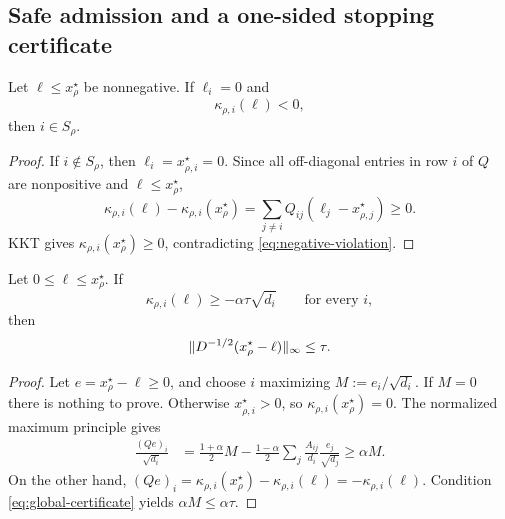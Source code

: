 \subsection{Safe admission and a one-sided stopping certificate}

\begin{lemma}
\label{lem:safe-admission}
Let $\ell\leq x_\rho^\star$ be nonnegative.  If $\ell_i=0$ and
\begin{equation}
  \kappa_{\rho,i}(\ell)<0,
  \label{eq:negative-violation}
\end{equation}
then $i\in S_\rho$.
\end{lemma}

\begin{proof}
If $i\notin S_\rho$, then $\ell_i=x_{\rho,i}^\star=0$.  Since all
off-diagonal entries in row $i$ of $Q$ are nonpositive and
$\ell\leq x_\rho^\star$,
\[
 \kappa_{\rho,i}(\ell)-\kappa_{\rho,i}(x_\rho^\star)
 =\sum_{j\neq i}Q_{ij}(\ell_j-x_{\rho,j}^\star)\geq0.
\]
KKT gives $\kappa_{\rho,i}(x_\rho^\star)\geq0$, contradicting
\cref{eq:negative-violation}.
\end{proof}

\begin{lemma}
\label{lem:one-sided-certificate}
Let $0\leq\ell\leq x_\rho^\star$.  If
\begin{equation}
  \kappa_{\rho,i}(\ell)\geq-\alpha\tau\sqrt{d_i}
  \qquad\text{for every }i,
  \label{eq:global-certificate}
\end{equation}
then
\begin{equation}
  \lVert D^{-1/2}(x_\rho^\star-\ell)\rVert_\infty\leq\tau.
  \label{eq:certificate-error}
\end{equation}
\end{lemma}

\begin{proof}
Let $e=x_\rho^\star-\ell\geq0$, and choose $i$ maximizing
$M:=e_i/\sqrt{d_i}$.  If $M=0$ there is nothing to prove.  Otherwise
$x_{\rho,i}^\star>0$, so $\kappa_{\rho,i}(x_\rho^\star)=0$.  The normalized
maximum principle gives
\begin{align*}
 \frac{(Qe)_i}{\sqrt{d_i}}
 &=\frac{1+\alpha}{2}M
   -\frac{1-\alpha}{2}
     \sum_j\frac{A_{ij}}{d_i}\frac{e_j}{\sqrt{d_j}}
 \geq\alpha M.
\end{align*}
On the other hand,
$(Qe)_i=\kappa_{\rho,i}(x_\rho^\star)-\kappa_{\rho,i}(\ell)
=-\kappa_{\rho,i}(\ell)$.  Condition \cref{eq:global-certificate} yields
$\alpha M\leq\alpha\tau$.
\end{proof}

